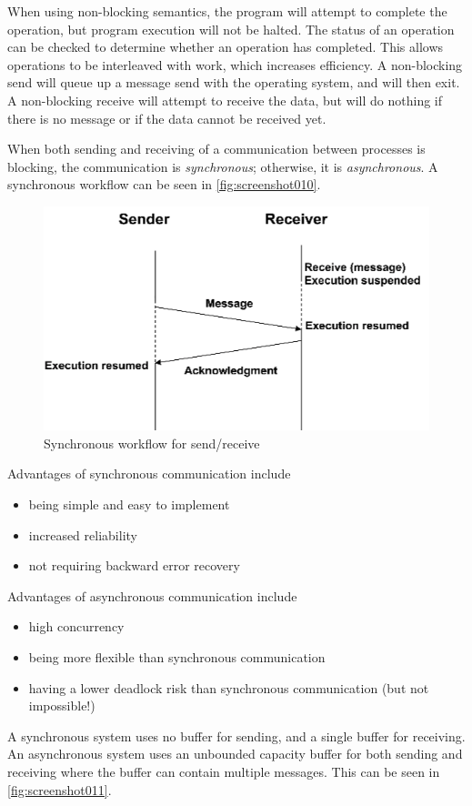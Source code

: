 When using non-blocking semantics, the program will attempt to complete the operation, but program execution will not be halted. The status of an operation can be checked to determine whether an operation has completed. This allows operations to be interleaved with work, which increases efficiency. A non-blocking send will queue up a message send with the operating system, and will then exit. A non-blocking receive will attempt to receive the data, but will do nothing if there is no message or if the data cannot be received yet.

When both sending and receiving of a communication between processes is blocking, the communication is \textit{synchronous}; otherwise, it is \textit{asynchronous}. A synchronous workflow can be seen in \autoref{fig:screenshot010}.

\begin{figure}[h]
\centering
\includegraphics[width=0.4\linewidth]{figures/screenshot010}
\caption{Synchronous workflow for send/receive}
\label{fig:screenshot010}
\end{figure}

Advantages of synchronous communication include \begin{itemize}
\item being simple and easy to implement
\item increased reliability
\item not requiring backward error recovery
\end{itemize}

Advantages of asynchronous communication include \begin{itemize}
\item high concurrency
\item being more flexible than synchronous communication
\item having a lower deadlock risk than synchronous communication (but not impossible!)
\end{itemize}

A synchronous system uses no buffer for sending, and a single buffer for receiving. An asynchronous system uses an unbounded capacity buffer for both sending and receiving where the buffer can contain multiple messages. This can be seen in \autoref{fig:screenshot011}.


